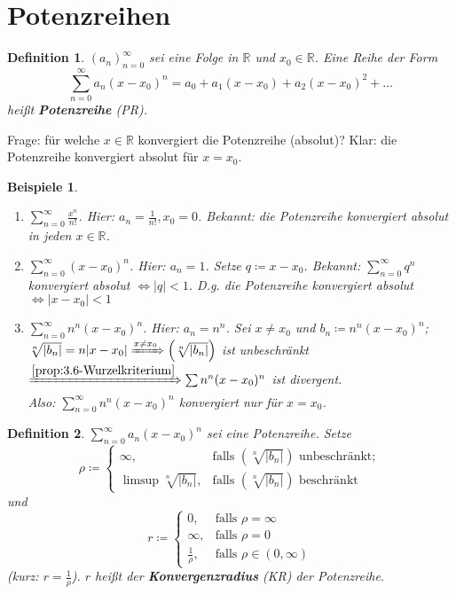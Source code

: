 \documentclass[titlepage,ngerman,a4paper,headsepline,DIV15,halfparskip*,14pt]{scrartcl}
\newcommand{\R}{\mathbb{R}}
\theoremstyle{dotless}
\newtheorem*{definition}{Definition}
\newtheorem*{beispiele}{Beispiele}
\begin{document}
\newpage


\section{Potenzreihen}

\begin{definition}
	$(a_{n})_{n=0}^{\infty}$ sei eine Folge in $\R$ und $x_{0} \in \R$. Eine Reihe der Form
		$$ \sum_{n=0}^{\infty} a_{n} (x - x_{0})^{n} = a_{0} + a_{1} (x - x_{0}) + a_{2} (x - x_{0})^{2} + \dotsc $$
		hei{\ss}t \textbf{Potenzreihe} (PR). 
\end{definition}

Frage: für welche $x \in \R$ konvergiert die Potenzreihe (absolut)? Klar: die Potenzreihe konvergiert absolut für $x = x_{0}$.

\begin{beispiele} ~\
	\begin{enumerate}
		\item $\sum_{n=0}^{\infty} \frac{x^{n}}{n!}$. Hier: $a_{n} = \frac{1}{n!}, x_{0} = 0$. Bekannt: die Potenzreihe konvergiert absolut in jeden $x \in \R$.
		\item $\sum_{n=0}^{\infty} (x - x_{0})^{n}$. Hier: $a_{n} = 1$. Setze $q \coloneqq x - x_{0}$. Bekannt: $\sum_{n=0}^{\infty} q^{n}$ konvergiert absolut $\iff |q| < 1$. D.g. die Potenzreihe konvergiert absolut $\iff |x - x_{0} | < 1$
		\item $\sum_{n=0}^{\infty} n^{n} (x - x_{0})^{n}$. Hier: $a_{n} = n^{n}$. Sei $x \neq x_{0}$ und $b_{n} \coloneqq n^{n} (x - x_{0})^{n}$; $\sqrt[n]{|b_{n}|} = n |x - x_{0}| \xRightarrow[]{x \neq x_{0}} \left( \sqrt[n]{|b_{n}|} \right)$ ist unbeschränkt $\xRightarrow[]{\ref{prop:3.6-Wurzelkriterium}} \sum n^{n} (x - x_{0})^{n}$ ist divergent. \\
			Also: $\sum_{n=0}^{\infty} n^{n} (x - x_{0})^{n}$ konvergiert nur für $x = x_{0}$.
	\end{enumerate}	
\end{beispiele}

\begin{definition}
	$\sum_{n=0}^{\infty} a_{n} (x - x_{0})^{n}$ sei eine Potenzreihe. Setze
		$$ \rho \coloneqq \begin{cases}
			\infty, & \text{falls } \left( \sqrt[n]{|b_{n}|} \right) \text{ unbeschränkt}; \\
			\limsup \sqrt[n]{|b_{n}|}, & \text{falls } \left( \sqrt[n]{|b_{n}|} \right) \text{ beschränkt}
		\end{cases} $$
	und
		$$ r \coloneqq \begin{cases}
			0, & \text{falls } \rho = \infty \\
			\infty, & \text{falls } \rho = 0 \\
			\frac{1}{\rho}, & \text{falls } \rho \in (0, \infty)
		\end{cases} $$
	(kurz: \glqq $r = \frac{1}{\rho}$\grqq). $r$ hei{\ss}t der \textbf{Konvergenzradius} (KR) der Potenzreihe.
\end{definition}
\end{document}
